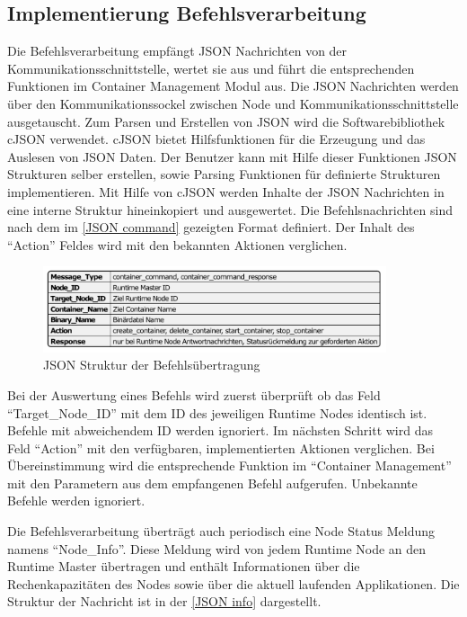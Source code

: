 \subsection{Implementierung Befehlsverarbeitung}
\label{Implementierung Befehlsverarbeitung}

Die Befehlsverarbeitung empfängt \gls{JSON} Nachrichten von der Kommunikationsschnittstelle, wertet sie aus und führt die entsprechenden Funktionen im Container Management Modul aus. Die \gls{JSON} Nachrichten werden über den Kommunikationssockel zwischen Node und Kommunikationsschnittstelle ausgetauscht. Zum Parsen und Erstellen von \gls{JSON} wird die Softwarebibliothek cJSON verwendet.  cJSON bietet Hilfsfunktionen für die Erzeugung und das Auslesen von \gls{JSON} Daten. Der Benutzer kann mit Hilfe dieser Funktionen \gls{JSON} Strukturen selber erstellen, sowie Parsing Funktionen für definierte Strukturen implementieren. Mit Hilfe von cJSON werden Inhalte der \gls{JSON} Nachrichten in eine interne Struktur hineinkopiert und ausgewertet. Die Befehlsnachrichten sind nach dem im \autoref{JSON command} gezeigten Format definiert. Der Inhalt des \enquote{Action} Feldes wird mit den bekannten Aktionen verglichen. 

\begin{figure}[htbp]
	\centering
	\includegraphics[width=0.9\textwidth]{./content/graphics/commandJSON.pdf}
	\caption{JSON Struktur der Befehlsübertragung}
	\label{JSON command}
\end{figure}

Bei der Auswertung eines Befehls wird zuerst überprüft ob das Feld \enquote{Target\_Node\_ID} mit dem ID des jeweiligen Runtime Nodes identisch ist. Befehle mit abweichendem ID werden ignoriert. Im nächsten Schritt wird das Feld \enquote{Action} mit den verfügbaren, implementierten Aktionen verglichen. Bei Übereinstimmung wird die entsprechende Funktion im \enquote{Container Management} mit den Parametern aus dem empfangenen Befehl aufgerufen. Unbekannte Befehle werden ignoriert.

Die Befehlsverarbeitung überträgt auch periodisch eine Node Status Meldung namens \enquote{Node\_Info}. Diese Meldung wird von jedem Runtime Node an den Runtime Master übertragen und enthält Informationen über die Rechenkapazitäten des Nodes sowie über die aktuell laufenden Applikationen. Die Struktur der Nachricht ist in der \autoref{JSON info} dargestellt.

